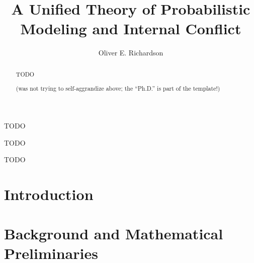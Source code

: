 \documentclass[tocprelim,
    ]{cornellmodified}
\title {%
    A Unified Theory of Probabilistic Modeling and Internal Conflict
}
\author {Oliver E. Richardson}
\begin{document}
\maketitle
\makecopyright

\begin{abstract}
TODO

(was not trying to self-aggrandize above; the ``Ph.D.'' is part of the template!)
\end{abstract}

\begin{biosketch}
TODO
\end{biosketch}

\begin{dedication}
TODO
\end{dedication}

\begin{acknowledgements}
TODO


\end{acknowledgements}

\renewcommand{\thepart}{Part~\Roman{part} :}
\contentspage
\figurelistpage

\normalspacing \setcounter{page}{1} 
\pagestyle{cornell} \addtolength{\parskip}{0.5\baselineskip}


\chapter{Introduction}
    
\chapter{Background and Mathematical Preliminaries}
    
\end{document}
